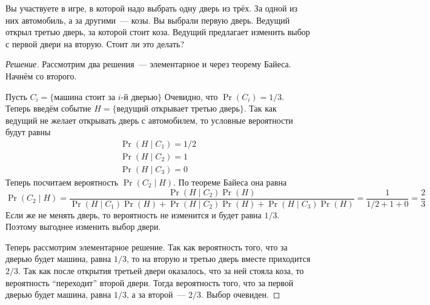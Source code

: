 \begin{problem}
    Вы участвуете в игре, в которой надо выбрать одну дверь из трёх. За одной из них автомобиль, а за другими~--- козы. Вы выбрали первую дверь. Ведущий открыл третью дверь, за которой стоит коза. Ведущий предлагает изменить выбор с первой двери на вторую. Стоит ли это делать?
\end{problem}
\begin{proof}[Решение]
    Рассмотрим два решения~--- элементарное и через теорему Байеса. Начнём со второго.
    
    Пусть \(C_{i} = \{\)машина стоит за \(i\)-й дверью\(\}\) Очевидно, что \(\Pr(C_i) = 1/3\). Теперь введём событие \(H = \{\)ведущий открывает третью дверь\(\}\). Так как ведущий не желает открывать дверь с автомобилем, то условные вероятности будут равны
    \[\begin{array}{l}
    \Pr(H \mid C_1) = 1/2 \\
    \Pr(H \mid C_2) = 1 \\
    \Pr(H \mid C_3) = 0
    \end{array}\]
    Теперь посчитаем вероятность \(\Pr(C_2 \mid H)\). По теореме Байеса она равна
    \[\Pr(C_2 \mid H) = \frac{\Pr(H \mid C_2)\Pr(H)}{\Pr(H \mid C_1)\Pr(H) + \Pr(H \mid C_2)\Pr(H) + \Pr(H \mid C_3)\Pr(H)} = \frac{1}{1/2 + 1 + 0} = \frac{2}{3}\]
    Если же не менять дверь, то вероятность не изменится и будет равна \(1/3\). Поэтому выгоднее изменить выбор двери.
    
    Теперь рассмотрим элементарное решение. Так как вероятность того, что за дверью будет машина, равна \(1/3\), то на вторую и третью дверь вместе приходится \(2/3\). Так как после открытия третьей двери оказалось, что за ней стояла коза, то вероятность ``переходит'' второй двери. Тогда вероятность того, что за первой дверью будет машина, равна \(1/3\), а за второй~--- \(2/3\). Выбор очевиден.
\end{proof}

